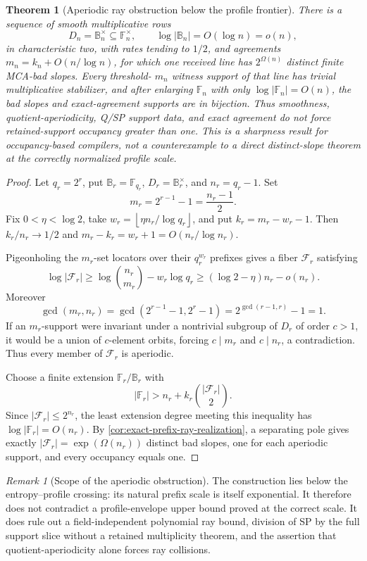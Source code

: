 \documentclass[12pt,a4paper]{amsart}
\numberwithin{equation}{section}
\newtheorem{theorem}{Theorem}[section]
\theoremstyle{remark}
\newtheorem{remark}[remark]{Remark}
\newcommand{\F}{\mathbb F}
\newcommand{\B}{\mathbb B}
\newcommand{\Fcal}{\mathcal F}
\newcommand{\abs}[1]{\lvert #1\rvert}
\newcommand{\floor}[1]{\left\lfloor #1\right\rfloor}
\begin{document}
\begin{theorem}[Aperiodic ray obstruction below the profile frontier]
\label{thm:aperiodic-ray-obstruction}
There is a sequence of smooth multiplicative rows
\[
 D_n=\B_n^\times\subseteq\F_n^\times,
 \qquad \log\abs{\B_n}=O(\log n)=o(n),
\]
in characteristic two, with rates tending to \(1/2\), and agreements
\(m_n=k_n+O(n/\log n)\), for which one received line has
\(2^{\Omega(n)}\) distinct finite MCA-bad slopes.  Every threshold-
\(m_n\) witness support of that line has trivial multiplicative
stabilizer, and after enlarging \(\F_n\) with only
\(\log\abs{\F_n}=O(n)\), the bad slopes and exact-agreement supports are
in bijection.  Thus smoothness, quotient-aperiodicity, Q/SP support data,
and exact agreement do not force retained-support occupancy greater than
one.  This is a sharpness result for occupancy-based compilers, not a
counterexample to a direct distinct-slope theorem at the correctly
normalized profile scale.
\end{theorem}

\begin{proof}
Let \(q_r=2^r\), put \(\B_r=\F_{q_r}\),
\(D_r=\B_r^\times\), and \(n_r=q_r-1\).  Set
\[
 m_r=2^{r-1}-1=\frac{n_r-1}{2}.
\]
Fix \(0<\eta<\log2\), take
\(w_r=\floor{\eta n_r/\log q_r}\), and put
\(k_r=m_r-w_r-1\).  Then \(k_r/n_r\to1/2\) and
\(m_r-k_r=w_r+1=O(n_r/\log n_r)\).

Pigeonholing the \(m_r\)-set locators over their \(q_r^{w_r}\) prefixes
gives a fiber \(\Fcal_r\) satisfying
\[
 \log\abs{\Fcal_r}
 \ge \log\binom{n_r}{m_r}-w_r\log q_r
 \ge(\log2-\eta)n_r-o(n_r).
\]
Moreover
\[
 \gcd(m_r,n_r)=
 \gcd(2^{r-1}-1,2^r-1)=2^{\gcd(r-1,r)}-1=1.
\]
If an \(m_r\)-support were invariant under a nontrivial subgroup of
\(D_r\) of order \(c>1\), it would be a union of \(c\)-element orbits,
forcing \(c\mid m_r\) and \(c\mid n_r\), a contradiction.  Thus every
member of \(\Fcal_r\) is aperiodic.

Choose a finite extension \(\F_r/\B_r\) with
\[
 \abs{\F_r}>n_r+k_r\binom{\abs{\Fcal_r}}2.
\]
Since \(\abs{\Fcal_r}\le2^{n_r}\), the least extension degree meeting
this inequality has \(\log\abs{\F_r}=O(n_r)\).  By
\cref{cor:exact-prefix-ray-realization}, a separating pole gives exactly
\(\abs{\Fcal_r}=\exp(\Omega(n_r))\) distinct bad slopes, one for each
aperiodic support, and every occupancy equals one.
\end{proof}

\begin{remark}[Scope of the aperiodic obstruction]
The construction lies below the entropy--profile crossing: its natural
prefix scale is itself exponential.  It therefore does not contradict a
profile-envelope upper bound proved at the correct scale.  It does rule
out a field-independent polynomial ray bound, division of SP by the full
support slice without a retained multiplicity theorem, and the assertion
that quotient-aperiodicity alone forces ray collisions.
\end{remark}
\end{document}
